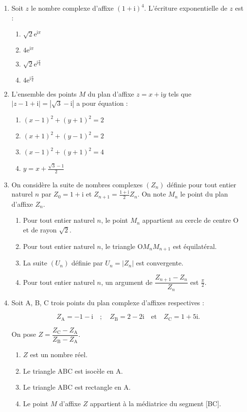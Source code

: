 \documentclass[10pt]{article}
\begin{document}
\begin{enumerate}
\item Soit $z$ le nombre complexe  d'affixe $(1 + \text{i})^4$. L'écriture exponentielle de $z$ est : 
	\begin{enumerate}
		\item $\sqrt{2}\text{e}^{\text{i}\pi}$
		\item $4\text{e}^{\text{i}\pi}$ 
		\item $\sqrt{2}\text{e}^{\text{i}\frac{\pi}{4}}$ 
		\item $4\text{e}^{\text{i}\frac{\pi}{4}}$
	\end{enumerate} 
\item L'ensemble des points $M$ du plan d'affixe $z = x + \text{i}y$ tels que $|z - 1 + \text{i}| = \left|\sqrt{3} - \text{i}\right|$ a pour équation : 
	\begin{enumerate}
		\item $(x - 1)^2 + (y + 1)^2 = 2$ 
		\item $(x + 1)^2 + (y - 1)^2 = 2$ 
		\item $(x - 1)^2 + (y + 1)^2 = 4$ 
		\item $y = x +  \frac{\sqrt{3} - 1}{2}$ 
	\end{enumerate} 
\item On considère la suite de nombres complexes $\left(Z_{n}\right)$ définie pour tout entier naturel $n$ par $Z_{0} = 1 + \text{i}$ et $Z_{n+1} = \frac{1 + \text{i}}{2}Z_{n}$. On note $M_{n}$ le point du plan d'affixe $Z_{n}$. 
	\begin{enumerate}
		\item Pour tout entier naturel $n$, le point $M_{n}$ appartient au cercle de centre O et de rayon $\sqrt{2}$.
		\item Pour tout entier naturel $n$, le triangle O$M_{n}M_{n + 1}$ est équilatéral. 
		\item La suite $\left(U_{n}\right)$ définie par $U_{n} = \left|Z_{n}\right|$  est convergente. 
		\item Pour tout entier naturel $n$, un argument de $\dfrac{Z_{n+1} - Z_{n}}{Z_{n}}$  est $\frac{\pi}{2}$. 
		\end{enumerate} 
\item Soit A, B, C trois points du plan complexe d'affixes respectives : 

\[Z_{\text{A}}= - 1 - \text{i} \quad ;\quad  Z_{\text{B}} = 2 - 2\text{i}\quad  \text{et}\quad  Z_{\text{C}} = 1 + 5\text{i}.\]

On pose $Z = \dfrac{Z_{\text{C}} - Z_{\text{A}}}{Z_{\text{B}} - Z_{\text{A}}}$.
	\begin{enumerate}
		\item $Z$ est un nombre réel. 
		\item Le triangle ABC est isocèle en A. 
		\item Le triangle ABC est rectangle en A. 
		\item Le point $M$ d'affixe $Z$ appartient à la médiatrice du segment [BC].
	\end{enumerate} 
\end{enumerate}
\end{document}
